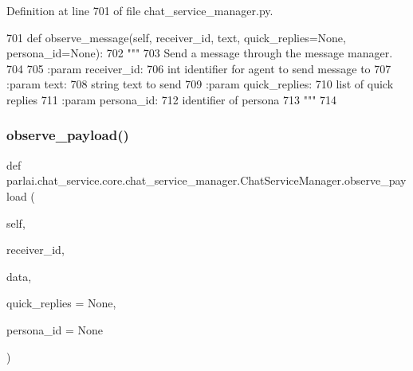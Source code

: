 Definition at line 701 of file chat\+\_\+service\+\_\+manager.\+py.


\begin{DoxyCode}
701     \textcolor{keyword}{def }observe\_message(self, receiver\_id, text, quick\_replies=None, persona\_id=None):
702         \textcolor{stringliteral}{"""}
703 \textcolor{stringliteral}{        Send a message through the message manager.}
704 \textcolor{stringliteral}{}
705 \textcolor{stringliteral}{        :param receiver\_id:}
706 \textcolor{stringliteral}{            int identifier for agent to send message to}
707 \textcolor{stringliteral}{        :param text:}
708 \textcolor{stringliteral}{            string text to send}
709 \textcolor{stringliteral}{        :param quick\_replies:}
710 \textcolor{stringliteral}{            list of quick replies}
711 \textcolor{stringliteral}{        :param persona\_id:}
712 \textcolor{stringliteral}{            identifier of persona}
713 \textcolor{stringliteral}{        """}
714 
\end{DoxyCode}
\mbox{\label{classparlai_1_1chat__service_1_1core_1_1chat__service__manager_1_1ChatServiceManager_ae4aa62ecd0ff74a95a9d259f2297eace}} 
\subsubsection{\texorpdfstring{observe\+\_\+payload()}{observe\_payload()}}
{\footnotesize\ttfamily def parlai.\+chat\+\_\+service.\+core.\+chat\+\_\+service\+\_\+manager.\+Chat\+Service\+Manager.\+observe\+\_\+payload (\begin{DoxyParamCaption}\item[{}]{self,  }\item[{}]{receiver\+\_\+id,  }\item[{}]{data,  }\item[{}]{quick\+\_\+replies = {\ttfamily None},  }\item[{}]{persona\+\_\+id = {\ttfamily None} }\end{DoxyParamCaption})}

